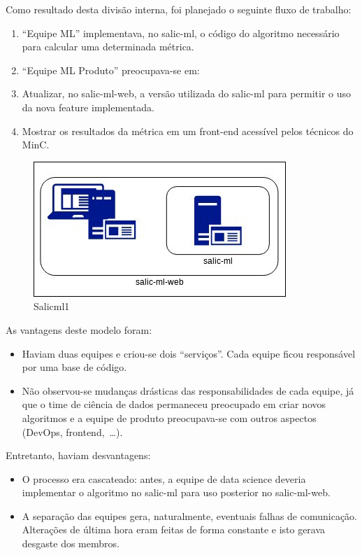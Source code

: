 Como resultado desta divisão interna, foi planejado o seguinte fluxo de
trabalho:

\begin{enumerate}
\def\labelenumi{\arabic{enumi}.}
\tightlist
\item
  ``Equipe ML'' implementava, no salic-ml, o código do algoritmo
  necessário para calcular uma determinada métrica.
\item
  ``Equipe ML Produto'' preocupava-se em:
\item
  Atualizar, no salic-ml-web, a versão utilizada do salic-ml para
  permitir o uso da nova feature implementada.
\item
  Mostrar os resultados da métrica em um front-end acessível pelos
  técnicos do MinC.
\end{enumerate}

\begin{figure}
\centering
\includegraphics{figs/salicml1.jpg}
\caption{Salicml1}
\end{figure}

As vantagens deste modelo foram:

\begin{itemize}
\tightlist
\item
  Haviam duas equipes e criou-se dois ``serviços''. Cada equipe ficou
  responsável por uma base de código.
\item
  Não observou-se mudanças drásticas das responsabilidades de cada
  equipe, já que o time de ciência de dados permaneceu preocupado em
  criar novos algoritmos e a equipe de produto preocupava-se com outros
  aspectos (DevOps, frontend,~\ldots{}).
\end{itemize}

Entretanto, haviam desvantagens:

\begin{itemize}
\tightlist
\item
  O processo era cascateado: antes, a equipe de data science deveria
  implementar o algoritmo no salic-ml para uso posterior no
  salic-ml-web.
\item
  A separação das equipes gera, naturalmente, eventuais falhas de
  comunicação. Alterações de última hora eram feitas de forma constante
  e isto gerava desgaste dos membros.
\end{itemize}

